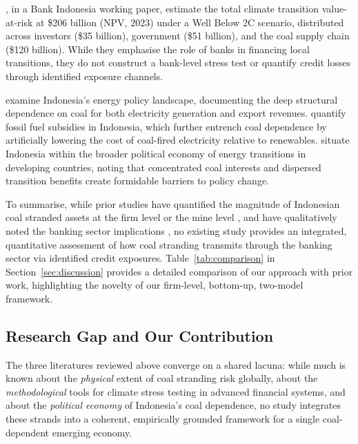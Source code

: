 \citet{Rishanty2023}, in a Bank Indonesia working paper, estimate the total climate transition value-at-risk at \$206 billion (NPV, 2023) under a Well Below 2\textdegree C scenario, distributed across investors (\$35 billion), government (\$51 billion), and the coal supply chain (\$120 billion). While they emphasise the role of banks in financing local transitions, they do not construct a bank-level stress test or quantify credit losses through identified exposure channels.

\citet{Burke2018} examine Indonesia's energy policy landscape, documenting the deep structural dependence on coal for both electricity generation and export revenues. \citet{Makhijani2015} quantify fossil fuel subsidies in Indonesia, which further entrench coal dependence by artificially lowering the cost of coal-fired electricity relative to renewables. \citet{JakobSteckel2016} situate Indonesia within the broader political economy of energy transitions in developing countries, noting that concentrated coal interests and dispersed transition benefits create formidable barriers to policy change.

To summarise, while prior studies have quantified the magnitude of Indonesian coal stranded assets at the firm level \citep{sonny2016} or the mine level \citep{Rishanty2023}, and have qualitatively noted the banking sector implications \citep{IESR2023}, no existing study provides an integrated, quantitative assessment of how coal stranding transmits through the banking sector via identified credit exposures. Table~\ref{tab:comparison} in Section~\ref{sec:discussion} provides a detailed comparison of our approach with prior work, highlighting the novelty of our firm-level, bottom-up, two-model framework.

\subsection{Research Gap and Our Contribution}
\label{subsec:research_gap}

The three literatures reviewed above converge on a shared lacuna: while much is known about the \textit{physical} extent of coal stranding risk globally, about the \textit{methodological} tools for climate stress testing in advanced financial systems, and about the \textit{political economy} of Indonesia's coal dependence, no study integrates these strands into a coherent, empirically grounded framework for a single coal-dependent emerging economy.

